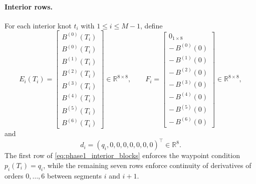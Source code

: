 \paragraph{Interior rows.}
For each interior knot $t_i$ with $1\le i\le M-1$, define
\begin{equation}
  \label{eq:phase1_interior_blocks}
  E_i(T_i)
  =
  \begin{bmatrix}
    B^{(0)}(T_i)\\
    B^{(0)}(T_i)\\
    B^{(1)}(T_i)\\
    B^{(2)}(T_i)\\
    B^{(3)}(T_i)\\
    B^{(4)}(T_i)\\
    B^{(5)}(T_i)\\
    B^{(6)}(T_i)
  \end{bmatrix}
  \in\mathbb R^{8\times 8},
  \qquad
  F_i
  =
  \begin{bmatrix}
    0_{1\times 8}\\
    -\,B^{(0)}(0)\\
    -\,B^{(1)}(0)\\
    -\,B^{(2)}(0)\\
    -\,B^{(3)}(0)\\
    -\,B^{(4)}(0)\\
    -\,B^{(5)}(0)\\
    -\,B^{(6)}(0)
  \end{bmatrix}
  \in\mathbb R^{8\times 8},
\end{equation}
and
\begin{equation}
  \label{eq:phase1_interior_rhs}
  d_i
  =
  (q_i,0,0,0,0,0,0,0)^\top \in\mathbb R^8.
\end{equation}
The first row of \eqref{eq:phase1_interior_blocks} enforces the waypoint condition
$p_i(T_i)=q_i$, while the remaining seven rows enforce continuity of derivatives of orders
$0,\dots,6$ between segments $i$ and $i+1$.

